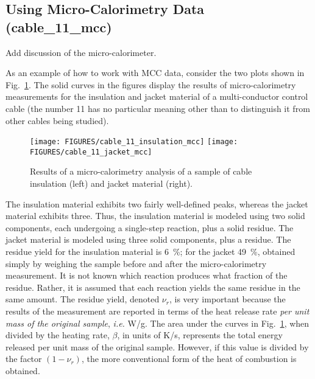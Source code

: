\documentclass[11pt]{book}
\begin{document}
\subsection{Using Micro-Calorimetry Data (\texorpdfstring{{\bf cable\_11\_mcc}}{cable\_11\_mcc})}
\label{cable_11_mcc}

Add discussion of the micro-calorimeter.

As an example of how to work with MCC data, consider the two plots shown in Fig.~\ref{mcc_plots}. The solid curves in the figures
display the results of micro-calorimetry measurements for the insulation and jacket material of a multi-conductor control
cable (the number 11 has no particular meaning other than to distinguish it from other cables being studied).
\begin{figure}[ht]
\texttt{[image: FIGURES/cable\_11\_insulation\_mcc]}
\texttt{[image: FIGURES/cable\_11\_jacket\_mcc]}
\caption{Results of a micro-calorimetry analysis of a sample of cable insulation (left) and jacket material (right).}
\label{mcc_plots}
\end{figure}
The insulation material exhibits two fairly well-defined peaks, whereas the jacket material exhibits three. Thus, the insulation
material is modeled using two solid components, each undergoing a single-step reaction, plus a solid residue. The jacket
material is modeled using three solid components, plus a residue. The residue yield for the insulation material is
6~\%; for the jacket 49~\%, obtained simply by weighing the sample before and after the micro-calorimetry measurement. It is
not known which reaction produces what fraction of the residue. Rather, it is assumed that each reaction yields the same
residue in the same amount.
The residue yield, denoted $\nu_r$, is very important because the results of the measurement are reported in terms of
the heat release rate {\em per unit mass of the original sample}, {\em i.e.} W/g. The area under the curves in
Fig.~\ref{mcc_plots}, when divided by the heating rate, $\beta$, in units of K/s, represents the total energy released
per unit mass of the original sample. However, if this value is divided by the factor $(1-\nu_r)$, the more conventional
form of the heat of combustion is obtained.
\end{document}
